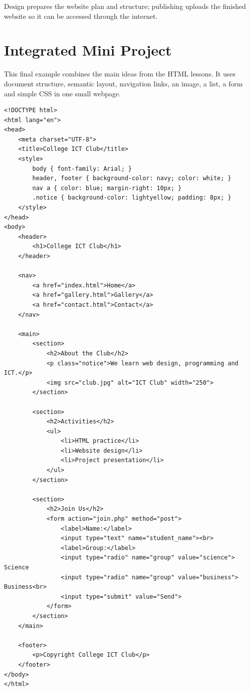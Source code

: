 \begin{summarybox}
Design prepares the website plan and structure; publishing uploads the finished website so it can be accessed through the internet.
\end{summarybox}

\section{Integrated Mini Project}

This final example combines the main ideas from the HTML lessons. It uses document structure, semantic layout, navigation links, an image, a list, a form and simple CSS in one small webpage.

\begin{lstlisting}[style=htmlide, caption={Mini Webpage Project}]
<!DOCTYPE html>
<html lang="en">
<head>
    <meta charset="UTF-8">
    <title>College ICT Club</title>
    <style>
        body { font-family: Arial; }
        header, footer { background-color: navy; color: white; }
        nav a { color: blue; margin-right: 10px; }
        .notice { background-color: lightyellow; padding: 8px; }
    </style>
</head>
<body>
    <header>
        <h1>College ICT Club</h1>
    </header>

    <nav>
        <a href="index.html">Home</a>
        <a href="gallery.html">Gallery</a>
        <a href="contact.html">Contact</a>
    </nav>

    <main>
        <section>
            <h2>About the Club</h2>
            <p class="notice">We learn web design, programming and ICT.</p>
            <img src="club.jpg" alt="ICT Club" width="250">
        </section>

        <section>
            <h2>Activities</h2>
            <ul>
                <li>HTML practice</li>
                <li>Website design</li>
                <li>Project presentation</li>
            </ul>
        </section>

        <section>
            <h2>Join Us</h2>
            <form action="join.php" method="post">
                <label>Name:</label>
                <input type="text" name="student_name"><br>
                <label>Group:</label>
                <input type="radio" name="group" value="science"> Science
                <input type="radio" name="group" value="business"> Business<br>
                <input type="submit" value="Send">
            </form>
        </section>
    </main>

    <footer>
        <p>Copyright College ICT Club</p>
    </footer>
</body>
</html>
\end{lstlisting}

